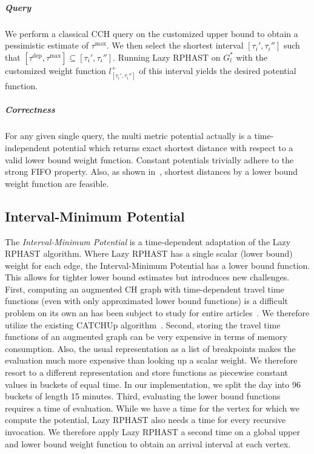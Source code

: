 \documentclass[a4paper,UKenglish,cleveref, autoref, thm-restate,anonymous]{lipics-v2021}
\newcommand*{\tdep}{\tau^{\operatorname{dep}}}
\newcommand*{\tmax}{\tau^{\max}}
\begin{document}
\subparagraph{Query}
We perform a classical CCH query on the customized upper bound to obtain a pessimistic estimate of $\tmax$.
We then select the shortest interval $[\tau_i', \tau_i'']$ such that $[\tdep,\tmax] \subseteq [\tau_i', \tau_i'']$.
Running Lazy RPHAST on $G^*_l$ with the customized weight function $l_{[\tau_i', \tau_i'']}^+$ of this interval yields the desired potential function.

\subparagraph{Correctness}
For any given single query, the multi metric potential actually is a time-independent potential which returns exact shortest distance with respect to a valid lower bound weight function.
Constant potentials trivially adhere to the strong FIFO property.
Also, as shown in~\cite{strasser_et_al:LIPIcs.SEA.2021.6}, shortest distances by a lower bound weight function are feasible.

\subsection{Interval-Minimum Potential}

The \emph{Interval-Minimum Potential} is a time-dependent adaptation of the Lazy RPHAST algorithm.
Where Lazy RPHAST has a single scalar (lower bound) weight for each edge, the Interval-Minimum Potential has a lower bound function.
This allows for tighter lower bound estimates but introduces new challenges.
First, computing an augmented CH graph with time-dependent travel time functions (even with only approximated lower bound functions) is a difficult problem on its own an has been subject to study for entire articles~\cite{bgsv-mtdtt-13,swz-sfert-21}.
We therefore utilize the existing CATCHUp algorithm~\cite{swz-sfert-21}.
Second, storing the travel time functions of an augmented graph can be very expensive in terms of memory consumption.
Also, the usual representation as a list of breakpoints makes the evaluation much more expensive than looking up a scalar weight.
We therefore resort to a different representation and store functions as piecewise constant values in buckets of equal time.
In our implementation, we split the day into 96 buckets of length 15 minutes.
Third, evaluating the lower bound functions requires a time of evaluation.
While we have a time for the vertex for which we compute the potential, Lazy RPHAST also needs a time for every recursive invocation.
We therefore apply Lazy RPHAST a second time on a global upper and lower bound weight function to obtain an arrival interval at each vertex.
\end{document}
